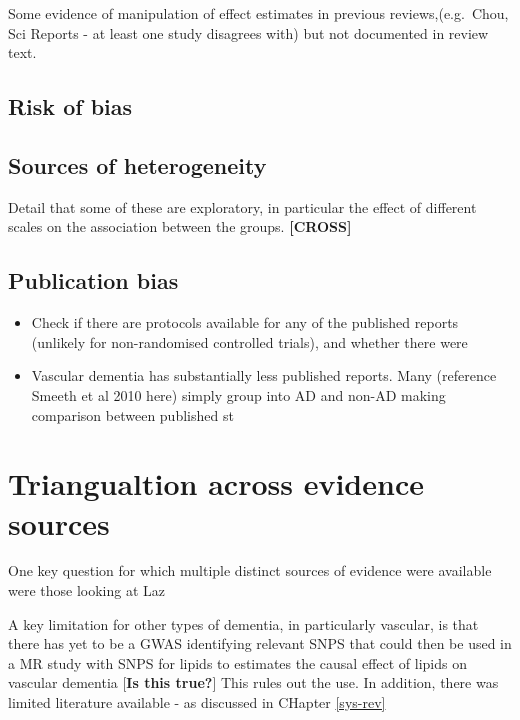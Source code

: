 \documentclass[a4paper, twoside]{templates/ociamthesis}
\providecommand{\tightlist}{%
  \setlength{\itemsep}{0pt}\setlength{\parskip}{0pt}}
\begin{document}
Some evidence of manipulation of effect estimates in previous reviews,(e.g.~Chou, Sci Reports - at least one study disagrees with) but not documented in review text.

\hypertarget{risk-of-bias-subheading}{%
\subsection{Risk of bias}\label{risk-of-bias-subheading}}

\hypertarget{sources-of-heterogeneity}{%
\subsection{Sources of heterogeneity}\label{sources-of-heterogeneity}}

Detail that some of these are exploratory, in particular the effect of different scales on the association between the groups. \textbf{{[}CROSS{]}}

\hypertarget{publication-bias}{%
\subsection{Publication bias}\label{publication-bias}}

\begin{itemize}
\tightlist
\item
  Check if there are protocols available for any of the published reports (unlikely for non-randomised controlled trials), and whether there were
\item
  Vascular dementia has substantially less published reports. Many (reference Smeeth et al 2010 here) simply group into AD and non-AD making comparison between published st
\end{itemize}

\hypertarget{triangualtion-across-evidence-sources}{%
\section{Triangualtion across evidence sources}\label{triangualtion-across-evidence-sources}}

One key question for which multiple distinct sources of evidence were available were those looking at Laz

A key limitation for other types of dementia, in particularly vascular, is that there has yet to be a GWAS identifying relevant SNPS that could then be used in a MR study with SNPS for lipids to estimates the causal effect of lipids on vascular dementia {[}\textbf{Is this true?}{]} This rules out the use. In addition, there was limited literature available - as discussed in CHapter \ref{sys-rev}
\end{document}
